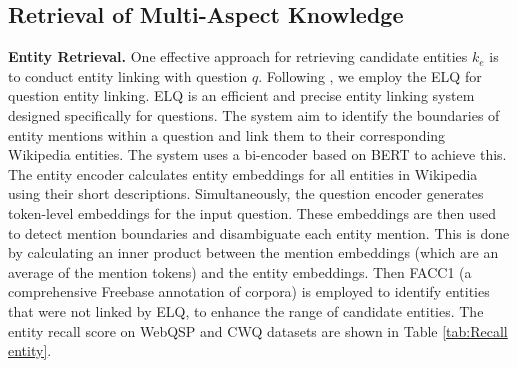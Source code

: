 \subsection{Retrieval of Multi-Aspect Knowledge}
\textbf{Entity Retrieval.} 
One effective approach for retrieving candidate entities $k_e$ is to conduct entity linking with question $q$. Following \citet{GMT-KBQA}, we employ the ELQ \cite{ELQ} for question entity linking. ELQ is an efficient and precise entity linking system designed specifically for questions. The system aim to identify the boundaries of entity mentions within a question and link them to their corresponding Wikipedia entities. The system uses a bi-encoder based on BERT \cite{devlin2018bert} to achieve this. The entity encoder calculates entity embeddings for all entities in Wikipedia \cite{wikidata} using their short descriptions. Simultaneously, the question encoder generates token-level embeddings for the input question. These embeddings are then used to detect mention boundaries and disambiguate each entity mention. This is done by calculating an inner product between the mention embeddings (which are an average of the mention tokens) and the entity embeddings.
Then FACC1 \cite{facc1} (a comprehensive Freebase annotation of corpora) is employed to identify entities that were not linked by ELQ, to enhance the range of candidate entities. The entity recall score on WebQSP and CWQ datasets are shown in Table \ref{tab:Recall entity}.


